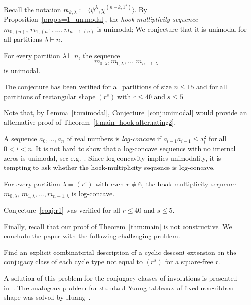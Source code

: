 Recall the notation $m_{k,\lambda}:= \langle 
\psi^{\lambda},\chi^{(n-k,1^k)} \rangle$. 
By Proposition~\ref{prop:s=1_unimodal}, the \emph{hook-multiplicity sequence} $m_{0,(n)},\,m_{1,(n)},\ldots, m_{n-1,(n)}$ is unimodal; 
We conjecture that it is unimodal for all partitions $\lambda\vdash n$.  

\begin{conjecture}\label{conj:unimodal}
    For every partition $\lambda \vdash n$, the sequence
    \[
        m_{0,\lambda},m_{1,\lambda},\ldots,m_{n-1,\lambda}
    \]
    is unimodal.
\end{conjecture}
    
The conjecture has been verified for all partitions of size $n \le 15$ and for all partitions of rectangular shape $(r^s)$ with $r \le 40$ and $s \le 5$.   
    
Note that, by Lemma~\ref{t:unimodal}, Conjecture~\ref{conj:unimodal} would provide an alternative proof of Theorem~\ref{t:main_hook-alternating2}. 
  
A sequence $a_0,\ldots,a_n$ of real numbers is 
\emph{log-concave} if  $a_{i-1}a_{i+1}\le a_i^2$ for all  $0<i<n$. 
It is not hard to show that a log-concave sequence with no internal zeros is unimodal, see e.g.~\cite{Brenti, Stanley}.
Since log-concavity implies unimodality, it is tempting to ask whether the hook-multiplicity sequence is log-concave.

\begin{conjecture}\label{conj:r1}
For every partition $\lambda=(r^s)$ with even $r\ne 6$,
the hook-multiplicity sequence $m_{0,\lambda},\,m_{1,\lambda},\ldots, m_{n-1,\lambda}$ is log-concave.
\end{conjecture}

Conjecture~\ref{conj:r1} 
was verified for all $r\leq 40$ and $s\leq 5$. 

Finally, recall that our proof of Theorem~\ref{thm:main} is not constructive. 
We conclude the paper with the following challenging 
problem.

\begin{problem} 
    Find 
    an explicit combinatorial description of a cyclic descent extension on the conjugacy class of each cycle type not equal to $(r^s)$ for a square-free $r$.
\end{problem}

A solution of this problem for the conjugacy classes of involutions 
is presented in~\cite{Adin-R23}. The analogous problem for standard Young tableaux of fixed non-ribbon shape was solved by Huang~\cite{Huang}. 


